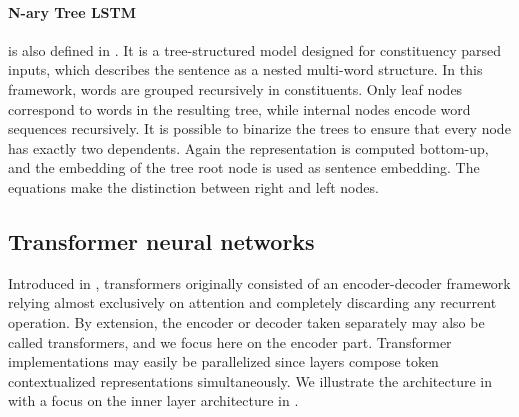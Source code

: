 \paragraph{N-ary Tree LSTM} is also defined in \textcite{tai_15}. It is a tree-structured model designed for constituency parsed inputs, which describes the sentence as a nested multi-word structure. In this framework, words are grouped recursively in constituents. Only leaf nodes correspond to words in the resulting tree, while internal nodes encode word sequences recursively. It is possible to binarize the trees to ensure that every node has exactly two dependents. Again the representation is computed bottom-up, and the embedding of the tree root node is used as sentence embedding. The equations make the distinction between right and left nodes.


\subsection{Transformer neural networks}

Introduced in \textcite{vaswani_17}, transformers originally consisted of an encoder-decoder framework relying almost exclusively on attention and completely discarding any recurrent operation. By extension, the encoder or decoder taken separately may also be called transformers, and we focus here on the encoder part. Transformer implementations may easily be parallelized since layers compose token contextualized representations simultaneously. We illustrate the architecture in  with a focus on the inner layer architecture in .


